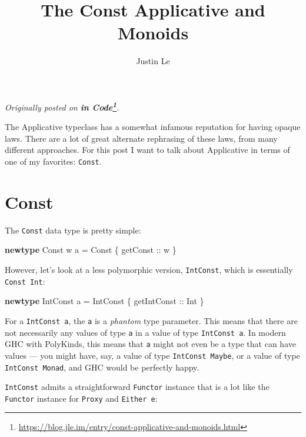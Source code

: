 \documentclass[]{article}
\title{The Const Applicative and Monoids}
\author{Justin Le}
\newenvironment{Shaded}{}{}
\newcommand{\DataTypeTok}[1]{\textcolor[rgb]{0.56,0.13,0.00}{#1}}
\newcommand{\FunctionTok}[1]{\textcolor[rgb]{0.02,0.16,0.49}{#1}}
\newcommand{\KeywordTok}[1]{\textcolor[rgb]{0.00,0.44,0.13}{\textbf{#1}}}
\newcommand{\NormalTok}[1]{#1}
\newcommand{\OtherTok}[1]{\textcolor[rgb]{0.00,0.44,0.13}{#1}}
\renewcommand{\href}[2]{#2\footnote{\url{#1}}}
\begin{document}
\maketitle

\emph{Originally posted on
\textbf{\href{https://blog.jle.im/entry/const-applicative-and-monoids.html}{in
Code}}.}

The Applicative typeclass has a somewhat infamous reputation for having opaque
laws. There are a lot of great alternate rephrasing of these laws, from many
different approaches. For this post I want to talk about Applicative in terms of
one of my favorites: \texttt{Const}.

\hypertarget{const}{%
\section{Const}\label{const}}

The \texttt{Const} data type is pretty simple:

\begin{Shaded}
\begin{Highlighting}[]
\KeywordTok{newtype} \DataTypeTok{Const}\NormalTok{ w a }\FunctionTok{=} \DataTypeTok{Const}\NormalTok{ \{}\OtherTok{ getConst ::}\NormalTok{ w \}}
\end{Highlighting}
\end{Shaded}

However, let's look at a less polymorphic version, \texttt{IntConst}, which is
essentially \texttt{Const\ Int}:

\begin{Shaded}
\begin{Highlighting}[]
\KeywordTok{newtype} \DataTypeTok{IntConst}\NormalTok{ a }\FunctionTok{=} \DataTypeTok{IntConst}\NormalTok{ \{}\OtherTok{ getIntConst ::} \DataTypeTok{Int}\NormalTok{ \}}
\end{Highlighting}
\end{Shaded}

For a \texttt{IntConst\ a}, the \texttt{a} is a \emph{phantom} type parameter.
This means that there are not necessarily any values of type \texttt{a} in a
value of type \texttt{IntConst\ a}. In modern GHC with PolyKinds, this means
that \texttt{a} might not even be a type that can have values --- you might
have, say, a value of type \texttt{IntConst\ Maybe}, or a value of type
\texttt{IntConst\ Monad}, and GHC would be perfectly happy.

\texttt{IntConst} admits a straightforward \texttt{Functor} instance that is a
lot like the \texttt{Functor} instance for \texttt{Proxy} and
\texttt{Either\ e}:
\end{document}
